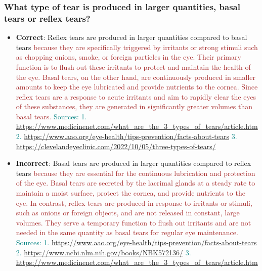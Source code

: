 \subsubsection*{What type of tear is produced in larger quantities, basal tears or reflex tears?}
\begin{itemize}[leftmargin=*]
    \item \textbf{Correct}: Reflex tears are produced in larger quantities compared to basal tears \textcolor{brown}{because they are specifically triggered by irritants or strong stimuli such as chopping onions, smoke, or foreign particles in the eye. Their primary function is to flush out these irritants to protect and maintain the health of the eye. Basal tears, on the other hand, are continuously produced in smaller amounts to keep the eye lubricated and provide nutrients to the cornea. Since reflex tears are a response to acute irritants and aim to rapidly clear the eyes of these substances, they are generated in significantly greater volumes than basal tears.} \textcolor{teal}{Sources: 1. \url{https://www.medicinenet.com/what_are_the_3_types_of_tears/article.htm} 2. \url{https://www.aao.org/eye-health/tips-prevention/facts-about-tears} 3. \url{https://clevelandeyeclinic.com/2022/10/05/three-types-of-tears/}}
    \item \textbf{Incorrect}: Basal tears are produced in larger quantities compared to reflex tears \textcolor{brown}{because they are essential for the continuous lubrication and protection of the eye. Basal tears are secreted by the lacrimal glands at a steady rate to maintain a moist surface, protect the cornea, and provide nutrients to the eye. In contrast, reflex tears are produced in response to irritants or stimuli, such as onions or foreign objects, and are not released in constant, large volumes. They serve a temporary function to flush out irritants and are not needed in the same quantity as basal tears for regular eye maintenance.} \textcolor{teal}{Sources: 1. \url{https://www.aao.org/eye-health/tips-prevention/facts-about-tears} 2. \url{https://www.ncbi.nlm.nih.gov/books/NBK572136/} 3. \url{https://www.medicinenet.com/what_are_the_3_types_of_tears/article.htm}}
\end{itemize}

